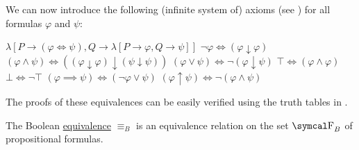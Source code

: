 \begin{Remark}
  We can now introduce the following (infinite system of) axioms (see ) for all formulas \( \varphi \) and \( \psi \):
  \begin{RefList}
     \( \lambda[P \to (\varphi \iff \psi), Q \to \lambda[P \to \varphi, Q \to \psi]] \)
     \( \neg \varphi \iff (\varphi \downarrow \varphi) \)
     \( (\varphi \wedge \psi) \iff ((\varphi \downarrow \varphi) \downarrow (\psi \downarrow \psi)) \)
     \( (\varphi \vee \psi) \iff \neg (\varphi \downarrow \psi) \)
     \( \top \iff (\varphi \wedge \varphi) \)
     \( \bot \iff \neg \top \)
     \( (\varphi \implies \psi) \iff (\neg \varphi \vee \psi) \)
     \( (\varphi \uparrow \psi) \iff \neg (\varphi \wedge \psi) \)
  \end{RefList}

  The proofs of these equivalences can be easily verified using the truth tables in .
\end{Remark}

\begin{Proposition}\label{thm:boolean_equivalence_relation}
  The Boolean \hyperref[def:propositional_interpretation]{equivalence} \( \equiv_B \) is an equivalence relation on the set \( \CF_B \) of propositional formulas.
\end{Proposition}

